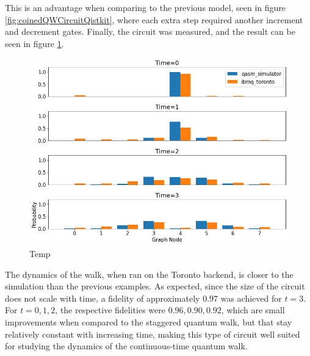 \documentclass[../../dissertation.tex]{subfiles}
\begin{document}
This is an advantage when comparing to the previous model, seen in figure \ref{fig:coinedQWCircuitQistkit}, where each extra step required another increment and decrement gates.  
Finally, the circuit was measured, and the result can be seen in figure \ref{fig:contQWQiskitDist}.
\begin{figure}[!h]
	\centering
	\includegraphics[scale=0.4]{img/Qiskit/ContQuantumWalk/ContQW_N3_S0123.png}
	\caption{Temp} 
	\label{fig:contQWQiskitDist}
\end{figure}
The dynamics of the walk, when ran on the Toronto backend, is closer to the simulation than the previous examples. As expected, since the size of the circuit does not scale with time, a fidelity of approximately $0.97$ was achieved for $t=3$. For $t=0,1,2$, the respective fidelities were $0.96, 0.90, 0.92$, which are small improvements when compared to the staggered quantum walk, but that stay relatively constant with increasing time, making this type of circuit well suited for studying the dynamics of the continuous-time quantum walk.
\end{document}
